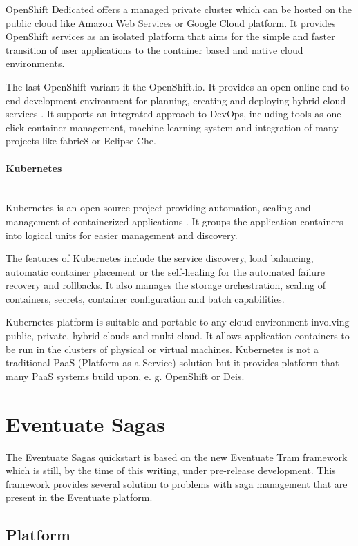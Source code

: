 \documentclass[oneside,
  digital, %
  table,   %
  nolof,     %
  nolot,     %
]{fithesis3}
\newcommand{\newlinepar}[1]{\paragraph{#1}\needspace{4\baselineskip}\mbox{}\\}
\begin{document}
OpenShift Dedicated offers a managed private cluster which can be hosted on the public cloud like Amazon Web Services or Google Cloud platform. It provides OpenShift services as an isolated platform that aims for the simple and faster transition of user applications to the container based and native cloud environments.

The last OpenShift variant it the OpenShift.io. It provides an open online end-to-end development environment for planning, creating and deploying hybrid cloud services \cite{openshift_io}. It supports an integrated approach to DevOps, including tools as one-click container management, machine learning system and integration of many projects like fabric8 or Eclipse Che.

\newlinepar{Kubernetes}

Kubernetes is an open source project providing automation, scaling and management of containerized applications \cite{kubernetes}. It groups the application containers into logical units for easier management and discovery.

The features of Kubernetes include the service discovery, load balancing, automatic container placement or the self-healing for the automated failure recovery and rollbacks. It also manages the storage orchestration, scaling of containers, secrets, container configuration and batch capabilities.

Kubernetes platform is suitable and portable to any cloud environment involving public, private, hybrid clouds and multi-cloud. It allows application containers to be run in the clusters of physical or virtual machines. Kubernetes is not a traditional PaaS (Platform as a Service) solution but it provides platform that many PaaS systems build upon, e. g. OpenShift or Deis.


\section{Eventuate Sagas}

The Eventuate Sagas quickstart is based on the new Eventuate Tram framework which is still, by the time of this writing, under pre-release development. This framework provides several solution to problems with saga management that are present in the Eventuate platform.

\subsection{Platform}
\end{document}
